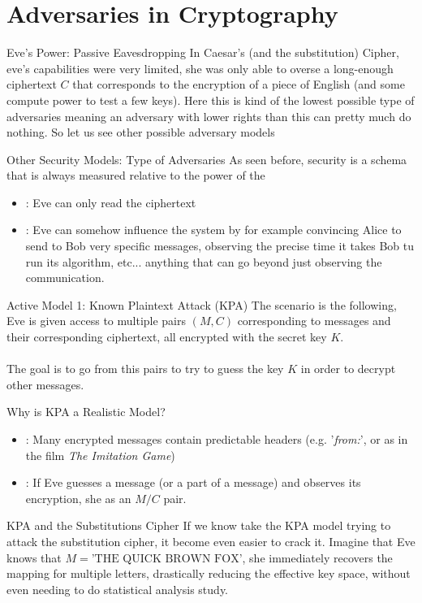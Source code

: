 \section{Adversaries in Cryptography}
\begin{parag}{Eve's Power: Passive Eavesdropping}
    In Caesar's (and the substitution) Cipher, eve's capabilities were very limited, she was only able to overse a long-enough ciphertext $C$ that corresponds to the encryption of a piece of English (and some compute power to test a few keys). Here this is kind of the lowest possible type of adversaries meaning an adversary with lower rights than this can pretty much do nothing. So let us see other possible adversary models
\end{parag}
\begin{parag}{Other Security Models: Type of Adversaries}
    As seen before, security is a schema that is always measured relative to the power of the 
	\begin{itemize}
	    \item {}: Eve can only read the ciphertext
	    \item {}: Eve can somehow influence the system by for example convincing Alice to send to Bob very specific messages, observing the precise time it takes Bob tu run its algorithm, etc... anything that can go beyond just observing the communication.
	\end{itemize}
\end{parag}
\begin{parag}{Active Model 1: Known Plaintext Attack (KPA)}
    The scenario is the following, Eve is given access to multiple pairs $\left(M, C\right)$ corresponding to messages and their corresponding ciphertext, all encrypted with the secret key $K$.\\
	$ $\\
	The goal is to go from this pairs to try to guess the key $K$ in order to decrypt other messages.
	\begin{subparag}{Why is KPA a Realistic Model?}
	    \begin{itemize}
	        \item {}: Many encrypted messages contain predictable headers (e.g. '\textit{from:}', or as in the film \textit{The Imitation Game})
	        \item {}: If Eve guesses a message (or a part of a message) and observes its encryption, she as an $M/C$ pair.
	    \end{itemize}
	\end{subparag}
	\begin{subparag}{KPA and the Substitutions Cipher}
	    If we know take the KPA model trying to attack the substitution cipher, it become even easier to crack it. Imagine that Eve knows that $M =  \text{'THE QUICK BROWN FOX'}$, she immediately recovers the mapping for multiple letters, drastically reducing the effective key space, without even needing to do statistical analysis study.
	\end{subparag}
\end{parag}


